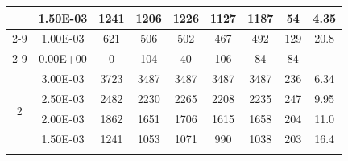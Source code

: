 \begin{table}[H]
{\begin{tabular}{|c|c|c|c|c|c|c|c|c|}
                               & 1.50E-03         & 1241      & 1206                                                       & 1226                                                      & 1127                                                      & 1187    & 54     & 4.35                                                               \\ \cline{2-9}
                               & 1.00E-03         & 621       & 506                                                        & 502                                                       & 467                                                       & 492     & 129    & 20.8                                                               \\ \cline{2-9}
                               & 0.00E+00         & 0         & 104                                                        & 40                                                        & 106                                                       & 84      & 84     & -                                                                  \\ \hline
            \multirow{6}{*}{2} & 3.00E-03         & 3723      & 3487                                                       & 3487                                                      & 3487                                                      & 3487    & 236    & 6.34                                                               \\ \cline{2-9}
                               & 2.50E-03         & 2482      & 2230                                                       & 2265                                                      & 2208                                                      & 2235    & 247    & 9.95                                                               \\ \cline{2-9}
                               & 2.00E-03         & 1862      & 1651                                                       & 1706                                                      & 1615                                                      & 1658    & 204    & 11.0                                                               \\ \cline{2-9}
                               & 1.50E-03         & 1241      & 1053                                                       & 1071                                                      & 990                                                       & 1038    & 203    & 16.4                                                               \\ \cline{2-9}

\end{tabular}}
\end{table}
